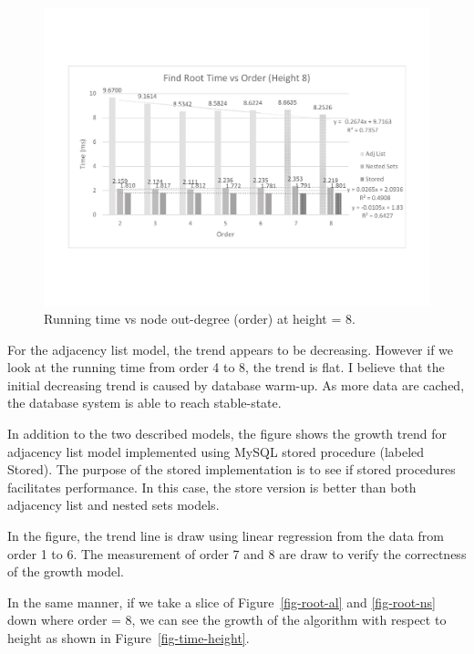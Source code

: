 \begin{figure}[h]
\begin{center}
\includegraphics[width=6in]{images/order.pdf}
\caption{Running time vs node out-degree (order) at height = 8.\label{fig-time-order}}
\end{center}
\end{figure}

For the adjacency list model, the trend appears to be decreasing. However if we look at the running time from order 4 to 8, the trend is flat. I believe that the initial decreasing trend is caused by database warm-up. As more data are cached, the database system is able to reach stable-state.

In addition to the two described models, the figure shows the growth trend for adjacency list model implemented using MySQL stored procedure (labeled Stored). The purpose of the stored implementation is to see if stored procedures facilitates performance. In this case, the store version is better than both adjacency list and nested sets models.

In the figure, the trend line is draw using linear regression from the data from order 1 to 6. The measurement of order 7 and 8 are draw to verify the correctness of the growth model.

In the same manner, if we take a slice of Figure~\ref{fig-root-al} and \ref{fig-root-ns} down where order = 8, we can see the growth of the algorithm with respect to height as shown in Figure~\ref{fig-time-height}.

